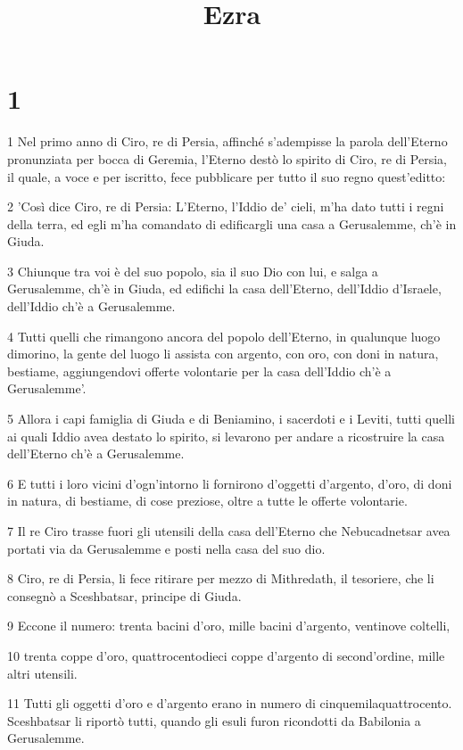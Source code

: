 

\title{Ezra}


\chapter{1}

\par 1 Nel primo anno di Ciro, re di Persia, affinché s'adempisse la parola dell'Eterno pronunziata per bocca di Geremia, l'Eterno destò lo spirito di Ciro, re di Persia, il quale, a voce e per iscritto, fece pubblicare per tutto il suo regno quest'editto:
\par 2 'Così dice Ciro, re di Persia: L'Eterno, l'Iddio de' cieli, m'ha dato tutti i regni della terra, ed egli m'ha comandato di edificargli una casa a Gerusalemme, ch'è in Giuda.
\par 3 Chiunque tra voi è del suo popolo, sia il suo Dio con lui, e salga a Gerusalemme, ch'è in Giuda, ed edifichi la casa dell'Eterno, dell'Iddio d'Israele, dell'Iddio ch'è a Gerusalemme.
\par 4 Tutti quelli che rimangono ancora del popolo dell'Eterno, in qualunque luogo dimorino, la gente del luogo li assista con argento, con oro, con doni in natura, bestiame, aggiungendovi offerte volontarie per la casa dell'Iddio ch'è a Gerusalemme'.
\par 5 Allora i capi famiglia di Giuda e di Beniamino, i sacerdoti e i Leviti, tutti quelli ai quali Iddio avea destato lo spirito, si levarono per andare a ricostruire la casa dell'Eterno ch'è a Gerusalemme.
\par 6 E tutti i loro vicini d'ogn'intorno li fornirono d'oggetti d'argento, d'oro, di doni in natura, di bestiame, di cose preziose, oltre a tutte le offerte volontarie.
\par 7 Il re Ciro trasse fuori gli utensili della casa dell'Eterno che Nebucadnetsar avea portati via da Gerusalemme e posti nella casa del suo dio.
\par 8 Ciro, re di Persia, li fece ritirare per mezzo di Mithredath, il tesoriere, che li consegnò a Sceshbatsar, principe di Giuda.
\par 9 Eccone il numero: trenta bacini d'oro, mille bacini d'argento, ventinove coltelli,
\par 10 trenta coppe d'oro, quattrocentodieci coppe d'argento di second'ordine, mille altri utensili.
\par 11 Tutti gli oggetti d'oro e d'argento erano in numero di cinquemilaquattrocento. Sceshbatsar li riportò tutti, quando gli esuli furon ricondotti da Babilonia a Gerusalemme.


